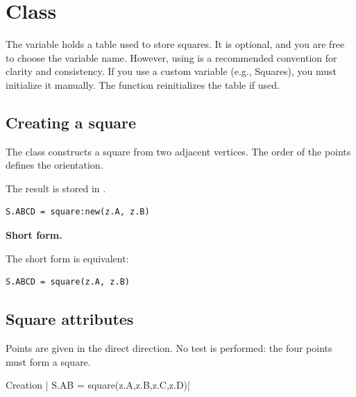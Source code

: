 \newpage
\section{Class }
The variable  holds a table used to store squares. It is optional, and you are free to choose the variable name. However, using  is a recommended convention for clarity and consistency. If you use a custom variable (e.g., Squares), you must initialize it manually. The  function reinitializes the  table if used.


\subsection{Creating a square}
\label{sub:creating_a_square}

The  class constructs a square from two adjacent vertices. The order of the points defines the orientation.


\medskip
The result is stored in .

\begin{mybox}
\begin{verbatim}
S.ABCD = square:new(z.A, z.B)
\end{verbatim}
\end{mybox}

\textbf{Short form.}

The short form  is equivalent:

\begin{mybox}
\begin{verbatim}
S.ABCD = square(z.A, z.B)
\end{verbatim}
\end{mybox}

\subsection{Square attributes}
\label{sub:square_attributes}
Points are given in the direct direction. No test is performed: the four points must form a square.
\begin{mybox}
Creation | S.AB = square(z.A,z.B,z.C,z.D)|
\end{mybox}


